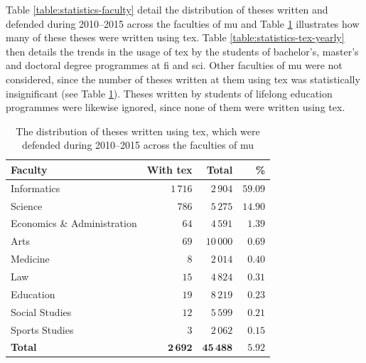 \documentclass[12pt,twoside,color,table]%
  {fithesis3/fithesis3/fithesis3} %
\begin{document}
  Table \ref{table:statistics-faculty} detail the distribution of
  theses written and defended during 2010--2015 across the
  faculties of \gls{mu} and Table \ref{table:statistics-tex}
  illustrates how many of these theses were written using
  \gls{tex}. Table \ref{table:statistics-tex-yearly} then details
  the trends in the usage of \gls{tex} by the students of
  bachelor's, master's and doctoral degree programmes at \gls{fi}
  and \gls{sci}. Other faculties of \gls{mu} were not considered,
  since the number of theses written at them using \gls{tex} was
  statistically insignificant (see Table
  \ref{table:statistics-tex}). Theses written by students of
  lifelong education programmes were likewise ignored, since none
  of them were written using \gls{tex}.

  \begin{table}
    \caption{The distribution of theses written using \gls{tex},
      which were defended during 2010--2015 across the faculties of
      \acrshort{mu}}
    \begin{tabularx}{\textwidth}{Xrrr}
      \textbf{Faculty} & \textbf{With \gls{tex}} & \textbf{Total} &
      \textbf{\%} \\
      \toprule
      Informatics                 & $1\,716$ & $2\,904$  &
      $59.09$ \\%
      Science                     & $786$     & $5\,275$  &
      $14.90$ \\%
      Economics \& Administration & $64$      & $4\,591$  &
      $1.39$  \\%
      Arts                        & $69$      & $10\,000$ &
      $0.69$  \\%
      Medicine                    & $8$       & $2\,014$  &
      $0.40$  \\%
      Law                         & $15$      & $4\,824$  &
      $0.31$  \\%
      Education                   & $19$      & $8\,219$  &
      $0.23$  \\%
      Social Studies              & $12$      & $5\,599$  &
      $0.21$  \\%
      Sports Studies              & $3$       & $2\,062$  &
      $0.15$  \\%
      \bottomrule
      \textbf{Total} & $\mathbf{2\,692}$ & $\mathbf{45\,488}$ &
      $\mathbf{5.92}$
    \end{tabularx}
    \label{table:statistics-tex}
  \end{table}
\end{document}
